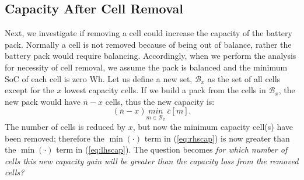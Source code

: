 \documentclass[10pt,twocolumn]{IEEEtran}
\begin{document}
\subsection{Capacity After Cell Removal }
Next, we investigate  if removing a cell could increase the capacity of the battery pack.
Normally  a cell is not removed because of being out of balance,  rather the battery  pack would require  balancing.
Accordingly,  when we perform the  analysis for necessity of cell removal, we assume the pack is balanced and the minimum SoC of each cell is zero Wh.
Let us define a new set, $\mathcal{B}_x$ as the set of all cells except for the $x$ lowest capacity cells.
If we build a pack from the cells in  $\mathcal{B}_x$, the new pack would have $\overline{n} - x$ cells, thus the new capacity is:
%
\begin{equation}
\label{eq:rhscap}
(\overline{n}-x) \underset{m\in \mathcal{B}_x}{min} \ \overline c[m].
\end{equation}
%
The number of cells is reduced by $x$, but now the minimum capacity cell(s) have been removed; therefore the $\min(\cdot)$ term in (\ref{eq:rhscap}) is now greater than the $\min(\cdot)$ term in (\ref{eq:lhscap}).
 The question   becomes \emph{ for which number of cells  this new capacity gain will be greater than the capacity loss from the removed cells? }
\end{document}
